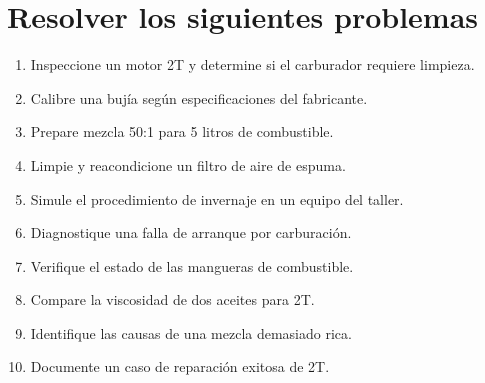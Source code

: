 \section*{\faWrench\space Resolver los siguientes problemas}
\begin{enumerate}
  \item Inspeccione un motor 2T y determine si el carburador requiere limpieza.
  \item Calibre una bujía según especificaciones del fabricante.
  \item Prepare mezcla 50:1 para 5 litros de combustible.
  \item Limpie y reacondicione un filtro de aire de espuma.
  \item Simule el procedimiento de invernaje en un equipo del taller.
  \item Diagnostique una falla de arranque por carburación.
  \item Verifique el estado de las mangueras de combustible.
  \item Compare la viscosidad de dos aceites para 2T.
  \item Identifique las causas de una mezcla demasiado rica.
  \item Documente un caso de reparación exitosa de 2T.
\end{enumerate}
